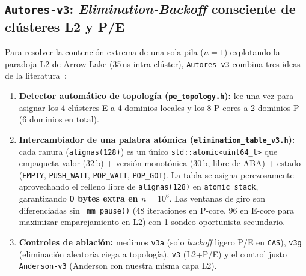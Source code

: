 \documentclass[10pt,twocolumn,a4paper]{article}
\begin{document}
\subsection{\texttt{Autores-v3}: \emph{Elimination-Backoff} consciente de clústeres L2 y P/E}
Para resolver la contención extrema de una sola pila ($n=1$) explotando la paradoja L2 de Arrow Lake (35\,ns intra-clúster), \texttt{Autores-v3} combina tres ideas de la literatura~\cite{hendler2004elimination,liu2022libasl,ouyang2022coreaware}:
\begin{enumerate}
  \item \textbf{Detector automático de topología (\texttt{pe\_topology.h}):} lee una vez  para asignar los 4 clústeres E a 4 dominios locales y los 8 P-cores a 2 dominios P (6 dominios en total).
  \item \textbf{Intercambiador de una palabra atómica (\texttt{elimination\_table\_v3.h}):} cada ranura (\texttt{alignas(128)}) es un único \texttt{std::atomic<uint64\_t>} que empaqueta valor (32\,b) + versión monotónica (30\,b, libre de ABA) + estado (\texttt{EMPTY}, \texttt{PUSH\_WAIT}, \texttt{POP\_WAIT}, \texttt{POP\_GOT}). La tabla se asigna perezosamente aprovechando el relleno libre de \texttt{alignas(128)} en \texttt{atomic\_stack}, garantizando \textbf{0 bytes extra en $n=10^6$}. Las ventanas de giro son diferenciadas sin \texttt{\_mm\_pause()} (48 iteraciones en P-core, 96 en E-core para maximizar emparejamiento en L2) con 1 sondeo oportunista secundario.
  \item \textbf{Controles de ablación:} medimos \texttt{v3a} (solo \emph{backoff} ligero P/E en \texttt{CAS}), \texttt{v3g} (eliminación aleatoria ciega a topología), \texttt{v3} (L2+P/E) y el control justo \texttt{Anderson-v3} (Anderson con nuestra misma capa L2).
\end{enumerate}
\end{document}

